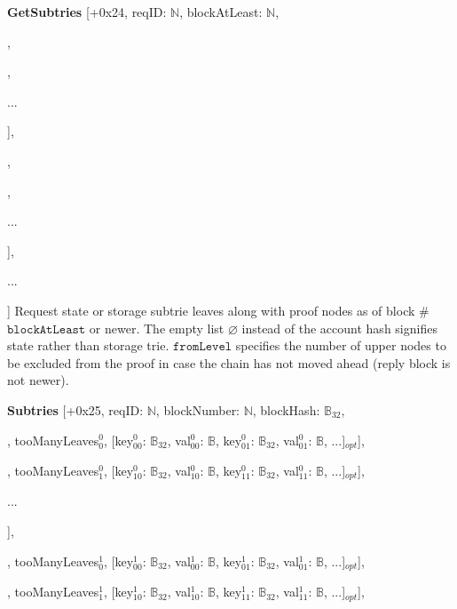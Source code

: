 \documentclass{amsart}
\begin{document}
\textbf{GetSubtries} [+0x24, reqID: $\mathbb{N}$, blockAtLeast: $\mathbb{N}$,

\quad [account$^0$: $\mathbb{B}_{32} | \varnothing$,

\qquad [prefix$^0_0$: $\mathbb{Y}$, fromLevel$^0_0$: $\mathbb{N}$],

,

\qquad ...

\quad ],

\quad [account$^1$: $\mathbb{B}_{32} | \varnothing$,

\qquad [prefix$^1_0$: $\mathbb{Y}$, fromLevel$^1_0$: $\mathbb{N}$],

,

\qquad ...

\quad ],

\quad ...

] Request state or storage subtrie leaves along with proof nodes as of block \#$\texttt{blockAtLeast}$ or newer.
The empty list $\varnothing$ instead of the account hash signifies state rather than storage trie.
$\texttt{fromLevel}$ specifies the number of upper nodes to be excluded from the proof in case the chain has not moved ahead (reply block is not newer).

\textbf{Subtries} [+0x25, reqID: $\mathbb{N}$, blockNumber: $\mathbb{N}$, blockHash: $\mathbb{B}_{32}$,

\quad [

\qquad [[node$^0_{00}$: $\mathbb{B}$, node$^0_{01}$: $\mathbb{B}$, ...], tooManyLeaves$^0_0$, [key$^0_{00}$: $\mathbb{B}_{32}$, val$^0_{00}$: $\mathbb{B}$, key$^0_{01}$: $\mathbb{B}_{32}$, val$^0_{01}$: $\mathbb{B}$, ...]$_{opt}$],

\qquad [[node$^0_{10}$: $\mathbb{B}$, node$^0_{11}$: $\mathbb{B}$, ...], tooManyLeaves$^0_1$, [key$^0_{10}$: $\mathbb{B}_{32}$, val$^0_{10}$: $\mathbb{B}$, key$^0_{11}$: $\mathbb{B}_{32}$, val$^0_{11}$: $\mathbb{B}$, ...]$_{opt}$],

\qquad ...

\quad ],

\quad [

\qquad [[node$^1_{00}$: $\mathbb{B}$, node$^1_{01}$: $\mathbb{B}$, ...], tooManyLeaves$^1_0$, [key$^1_{00}$: $\mathbb{B}_{32}$, val$^1_{00}$: $\mathbb{B}$, key$^1_{01}$: $\mathbb{B}_{32}$, val$^1_{01}$: $\mathbb{B}$, ...]$_{opt}$],

\qquad [[node$^1_{10}$: $\mathbb{B}$, node$^1_{11}$: $\mathbb{B}$, ...], tooManyLeaves$^1_1$, [key$^1_{10}$: $\mathbb{B}_{32}$, val$^1_{10}$: $\mathbb{B}$, key$^1_{11}$: $\mathbb{B}_{32}$, val$^1_{11}$: $\mathbb{B}$, ...]$_{opt}$],
\end{document}
